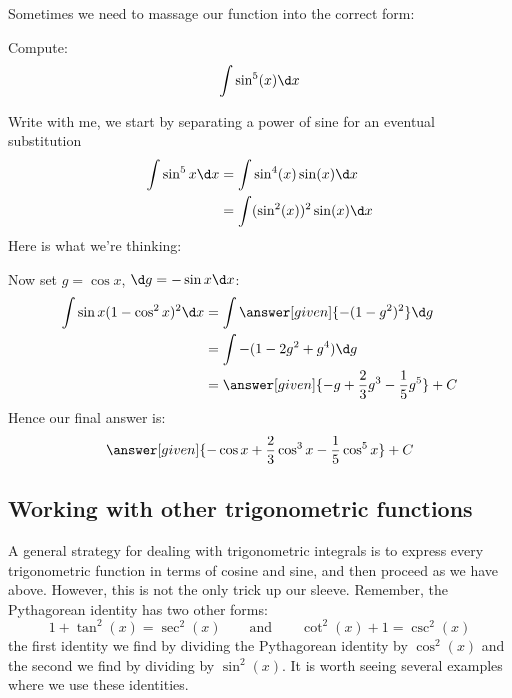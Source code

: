 \documentclass{ximera}
\begin{document}
Sometimes we need to massage our function into the correct form:

\begin{example}
  Compute:
  \[
  \int \sin^5(x) \d x
  \]
  \begin{explanation}
    Write with me, we start by separating a power of sine for an eventual substitution
    \begin{align*}
      \int \sin^5 x\d x &=\int \sin^4(x) \sin(x) \d x\\
      &=\int (\sin^2(x))^2 \sin(x) \d x
    \end{align*}
    Here is what we're thinking:
    \begin{center}%
    \end{center}
    Now set $g=\cos x$, $\d g=-\sin x\d x$:
    \begin{align*}
      \int \sin x (1-\cos^2 x)^2\d x&=\int \answer[given]{-(1-g^2)^2} \d g \\
      &=\int -(1-2g^2+g^4)\d g \\
      &=\answer[given]{-g+\frac{2}{3}g^3-\frac{1}{5}g^5}+C
    \end{align*}
    Hence our final answer is:
    \[
    \answer[given]{-\cos x+\frac{2}{3}\cos^3 x-\frac{1}{5}\cos^5x}+C
    \]
  \end{explanation}
\end{example}


\subsection{Working with other trigonometric functions}

A general strategy for dealing with trigonometric integrals is to
express every trigonometric function in terms of cosine and sine, and
then proceed as we have above. However, this is not the only trick up
our sleeve.  Remember, the Pythagorean identity has two other forms:
\[
1 + \tan^2(x) = \sec^2(x) \qquad\text{and}\qquad \cot^2(x) + 1 = \csc^2(x)
\]
the first identity we find by dividing the Pythagorean identity by
$\cos^2(x)$ and the second we find by dividing by $\sin^2(x)$. It is
worth seeing several examples where we use these identities.
\end{document}
